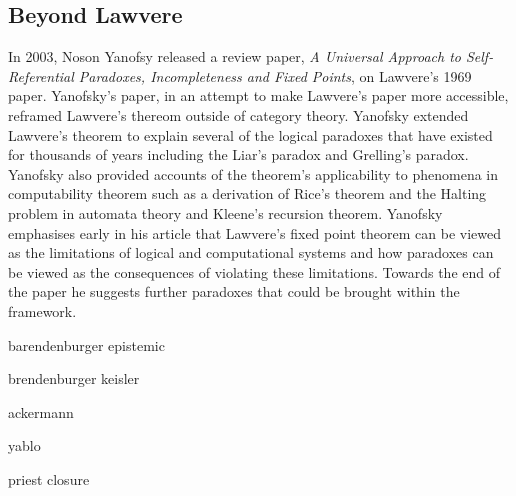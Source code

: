 
\subsection{Beyond Lawvere}

In 2003, Noson Yanofsy released a review paper, \textit{A Universal Approach to
Self-Referential Paradoxes, Incompleteness and Fixed Points}, on Lawvere's 1969
paper.  Yanofsky's paper, in an attempt to make Lawvere's paper more accessible,
reframed Lawvere's thereom outside of category theory. Yanofsky extended
Lawvere's theorem to explain several of the logical paradoxes that have existed
for thousands of years including the Liar's paradox and Grelling's paradox.
Yanofsky also provided accounts of the theorem's applicability to phenomena in
computability theorem such as a derivation of Rice's theorem  and the Halting
problem in automata theory and Kleene's recursion theorem. Yanofsky emphasises
early in his article that Lawvere's fixed point theorem can be viewed as the
limitations of logical and computational systems and how paradoxes can be viewed
as the consequences of violating these limitations. Towards the end of the paper
he suggests further paradoxes that could be brought within the framework.

barendenburger epistemic

brendenburger keisler

ackermann

yablo

priest closure


